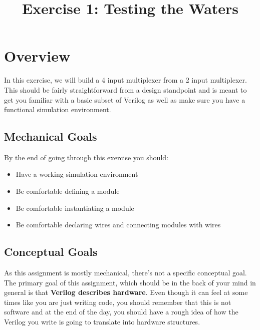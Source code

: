 \documentclass{article}
\begin{document}
\title{Exercise 1: Testing the Waters}
\date{}
\maketitle

\section*{Overview}
In this exercise, we will build a 4 input multiplexer from a 2 input
multiplexer. This should be fairly straightforward from a design standpoint and
is meant to get you familiar with a basic subset of Verilog as well as make sure
you have a functional simulation environment.

\subsection*{Mechanical Goals}
By the end of going through this exercise you should:
\begin{itemize}
    \item Have a working simulation environment
    \item Be comfortable defining a module
    \item Be comfortable instantiating a module
    \item Be comfortable declaring wires and connecting modules with wires 
\end{itemize}

\subsection*{Conceptual Goals}
As this assignment is mostly mechanical, there's not a specific conceptual goal.
The primary goal of this assignment, which should be in the back of your mind in
general is that \textbf{Verilog describes hardware}. Even though it can feel at
some times like you are just writing code, you should remember that this is not
software and at the end of the day, you should have a rough idea of how the
Verilog you write is going to translate into hardware structures. 
\end{document}
